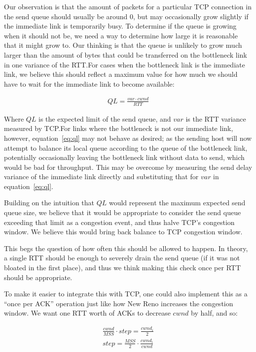 Our observation is that the amount of packets for a particular TCP connection in
the send queue should usually be around 0, but may occasionally grow slightly if
the immediate link is temporarily busy. To determine if the queue is growing
when it should not be, we need a way to determine how large it is reasonable
that it might grow to. Our thinking is that the queue is unlikely to grow much
larger than the amount of bytes that could be transferred on the bottleneck link
in one variance of the RTT.\@ For cases when the bottleneck link is the
immediate link, we believe this should reflect a maximum value for how much we
should have to wait for the immediate link to become available:

\begin{align}
  QL = \frac{var \cdot cwnd}{RTT}\label{eq:ql}
\end{align}

Where $QL$ is the expected limit of the send queue, and $var$ is the RTT
variance measured by TCP.\@ For links where the bottleneck is not our immediate
link, however, equation~\ref{eq:ql} may not behave as desired; as the sending
host will now attempt to balance its local queue according to the queue of the
bottleneck link, potentially occasionally leaving the bottleneck link without
data to send, which would be bad for throughput. This may be overcome by
measuring the send delay variance of the immediate link directly and
substituting that for $var$ in equation~\ref{eq:ql}.

Building on the intuition that $QL$ would represent the maximum expected send
queue size, we believe that it would be appropriate to consider the send queue
exceeding that limit as a congestion event, and thus halve TCP's congestion
window. We believe this would bring back balance to TCP congestion window.

This begs the question of how often this should be allowed to happen. In theory,
a single RTT should be enough to severely drain the send queue (if it was not
bloated in the first place), and thus we think making this check once per RTT
should be appropriate.

To make it easier to integrate this with TCP, one could also implement this as a
``once per ACK'' operation just like how New Reno increases the congestion
window. We want one RTT worth of ACKs to decrease $cwnd$ by half, and so:

\begin{align*}
  \frac{cwnd}{MSS} \cdot step = \frac{cwnd_i}{2} \\
  step = \frac{MSS}{2} \cdot \frac{cwnd_i}{cwnd}
\end{align*}

